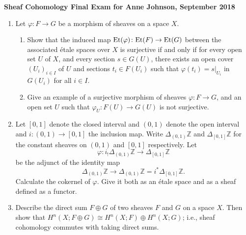\documentclass{article}
\newcommand{\Et}{\mbox{\rm Et}}
\newcommand{\zed}{\mathbb Z}
\begin{document}
\begin{center}
{\bf Sheaf Cohomology Final Exam for Anne Johnson, September 2018}
\end{center}

\begin{enumerate}
\item
Let $\varphi\colon F\to G$ be a morphism of sheaves on a space $X$.
\begin{enumerate}
 \item Show that the induced map $\Et(\varphi)\colon\Et(F)\to\Et(G)$ between the associated 
\'etale spaces over $X$ is surjective if and only if for every open set $U$ of $X$, and every section $s\in G(U)$,
there exists an open cover $(U_i)_{i\in I}$ of $U$ and sections $t_i\in F(U_i)$ such that $\varphi(t_i)=s|_{U_i}$ in $G(U_i)$ for all $i\in I$.
\item Give an example of a surjective morphism of sheaves $\varphi\colon F\to G$, and an open set $U$ such that $\varphi_U\colon F(U)\to G(U)$ is not surjective.
\end{enumerate}
 
 \item 
Let $[0, 1]$ denote the closed interval and $(0, 1)$ denote the open
interval and $i: (0, 1) \to [0, 1]$ the inclusion map. Write $\Delta_{(0,1)}\zed$
and $\Delta_{[0,1]}\zed$ for the constant sheaves on $(0,1)$ and $[0,1]$ respectively. Let
$$\varphi: i_!\Delta_{(0,1)}\zed \to \Delta_{[0,1]}\zed$$
be the adjunct of the identity map
$$\Delta_{(0,1)}\zed \to \Delta_{(0,1)}\zed = i^*\Delta_{[0,1]}\zed.$$
Calculate the cokernel of $\varphi$. Give it both as an \'etale space and
as a sheaf defined as a functor.
\item
Describe the direct sum $F\oplus G$ of two sheaves $F$ and $G$ on a space $X$.
Then show that $H^n(X;F\oplus G)\cong H^n(X;F)\oplus H^n(X;G)$; i.e., sheaf cohomology commutes with taking direct sums.


\end{enumerate}
\end{document}
